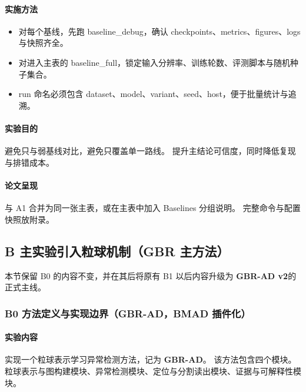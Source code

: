 \documentclass[UTF8,a4paper]{ctexart}
\newcommand{\gbrvtwo}{\textbf{GBR-AD v2}}
\begin{document}
\paragraph{实施方法}
\begin{itemize}
  \item 对每个基线，先跑 baseline\_debug，确认 checkpoints、metrics、figures、logs 与快照齐全。
  \item 对进入主表的 baseline\_full，锁定输入分辨率、训练轮数、评测脚本与随机种子集合。
  \item run 命名必须包含 dataset、model、variant、seed、host，便于批量统计与追溯。
\end{itemize}

\paragraph{实验目的}
避免只与弱基线对比，避免只覆盖单一路线。
提升主结论可信度，同时降低复现与排错成本。

\paragraph{论文呈现}
与 A1 合并为同一张主表，或在主表中加入 Baselines 分组说明。
完整命令与配置快照放附录。

\subsection{B 主实验\quad 引入粒球机制（GBR 主方法）}
本节保留 B0 的内容不变，并在其后将原有 B1 以后内容升级为 \gbrvtwo 的正式主线。

\subsubsection{B0 方法定义与实现边界（GBR-AD，BMAD 插件化）}

\paragraph{实验内容}
实现一个粒球表示学习异常检测方法，记为 \textbf{GBR-AD}。
该方法包含四个模块。
粒球表示与图构建模块、异常检测模块、定位与分割读出模块、证据与可解释性模块。
\end{document}
